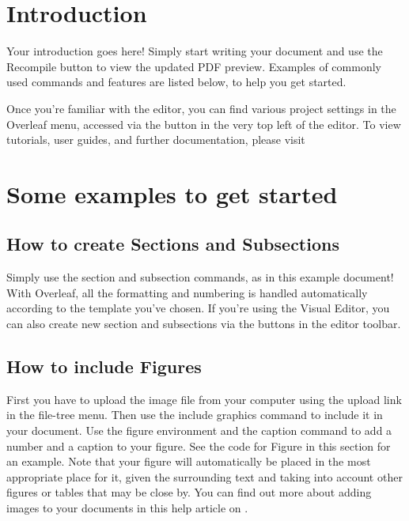 \section{Introduction}

Your introduction goes here! Simply start writing your document and use the
Recompile button to view the updated PDF preview. Examples of commonly used commands
and features are listed below, to help you get started.

Once you're familiar with the editor, you can find various project settings in the
Overleaf menu, accessed via the button in the very top left of the editor. To view
tutorials, user guides, and further documentation, please visit

\section{Some examples to get started}

\subsection{How to create Sections and Subsections}

Simply use the section and subsection commands, as in this example document!
With Overleaf, all the formatting and numbering is handled automatically according
to the template you've chosen. If you're using the Visual Editor, you can also create
new section and subsections via the buttons in the editor toolbar.

\subsection{How to include Figures}

First you have to upload the image file from your computer using the upload link
in the file-tree menu. Then use the include graphics command to include it in your
document. Use the figure environment and the caption command to add a number and
a caption to your figure. See the code for Figure in this section for an example.
Note that your figure will automatically be placed in the most appropriate place
for it, given the surrounding text and taking into account other figures or tables
that may be close by. You can find out more about adding images to your
documents in this help article on .


